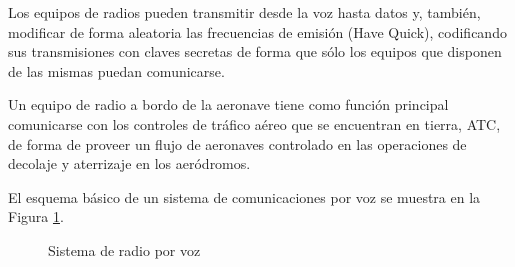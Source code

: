 Los equipos de radios pueden transmitir desde la voz hasta datos y, tambi\'en, modificar de forma aleatoria las frecuencias de emisi\'on (Have Quick), codificando sus transmisiones con claves secretas de forma que s\'olo los equipos que disponen de las mismas puedan comunicarse.



Un equipo de radio a bordo de la aeronave tiene como funci\'on principal comunicarse con los controles de tr\'afico a\'ereo que se encuentran en tierra, \ac{ATC}, 
de forma de proveer un flujo de aeronaves controlado en las operaciones de decolaje y aterrizaje en los aer\'odromos. 

El esquema b\'asico de un sistema de comunicaciones por voz se muestra en la Figura \ref{fig:sistema.radio.x.voz}.

\begin{figure}[!h]
  \centering
  \caption{Sistema de radio por voz}
  \label{fig:sistema.radio.x.voz}
\end{figure}



%


